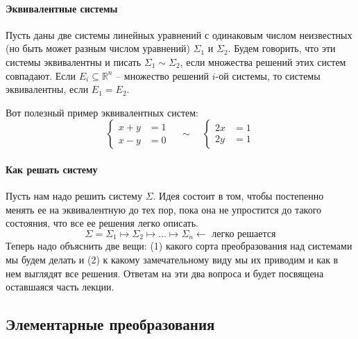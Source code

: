 \paragraph{Эквивалентные системы}

Пусть даны две системы линейных уравнений с одинаковым числом неизвестных (но быть может разным числом уравнений) $\Sigma_1$ и $\Sigma_2$.
Будем говорить, что эти системы эквивалентны и писать $\Sigma_1 \sim \Sigma_2$, если множества решений этих систем совпадают.
Если $E_i\subseteq \mathbb R^n$ -- множество решений $i$-ой системы, то системы эквивалентны, если $E_1 = E_2$.

Вот полезный пример эквивалентных систем:
\[
\left\{
\begin{aligned}
x + y &= 1\\
x - y &= 0
\end{aligned}
\right.\quad\sim\quad
\left\{
\begin{aligned}
2x &= 1\\
2y &= 1
\end{aligned}
\right.
\]

\paragraph{Как решать систему}

Пусть нам надо решить систему $\Sigma$.
Идея состоит в том, чтобы постепенно менять ее на эквивалентную до тех пор, пока она не упростится до такого состояния, что все ее решения легко описать.
\[
\Sigma = \Sigma_1 \mapsto \Sigma_2 \mapsto \ldots \mapsto \Sigma_n \leftarrow\text{ легко решается}
\]
Теперь надо объяснить две вещи: (1) какого сорта преобразования над системами мы будем делать и (2) к какому замечательному виду мы их приводим и как в нем выглядят все решения.
Ответам на эти два вопроса и будет посвящена оставшаяся часть лекции.

\subsection{Элементарные преобразования} 

